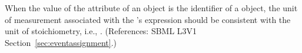 When the value of the attribute  of an \EventAssignment
object is the identifier of a \SpeciesReference object, the unit of
measurement associated with the \EventAssignment's  expression
should be consistent with the unit of stoichiometry, i.e.,
.  (References: SBML L3V1
Section~\ref{sec:eventassignment}.)

